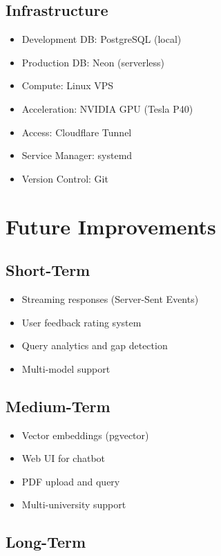 \documentclass[12pt]{article}
\begin{document}
\subsection{Infrastructure}

\begin{itemize}
    \item Development DB: PostgreSQL (local)
    \item Production DB: Neon (serverless)
    \item Compute: Linux VPS
    \item Acceleration: NVIDIA GPU (Tesla P40)
    \item Access: Cloudflare Tunnel
    \item Service Manager: systemd
    \item Version Control: Git
\end{itemize}

\section{Future Improvements}

\subsection{Short-Term}

\begin{itemize}
    \item Streaming responses (Server-Sent Events)
    \item User feedback rating system
    \item Query analytics and gap detection
    \item Multi-model support
\end{itemize}

\subsection{Medium-Term}

\begin{itemize}
    \item Vector embeddings (pgvector)
    \item Web UI for chatbot
    \item PDF upload and query
    \item Multi-university support
\end{itemize}

\subsection{Long-Term}
\end{document}
